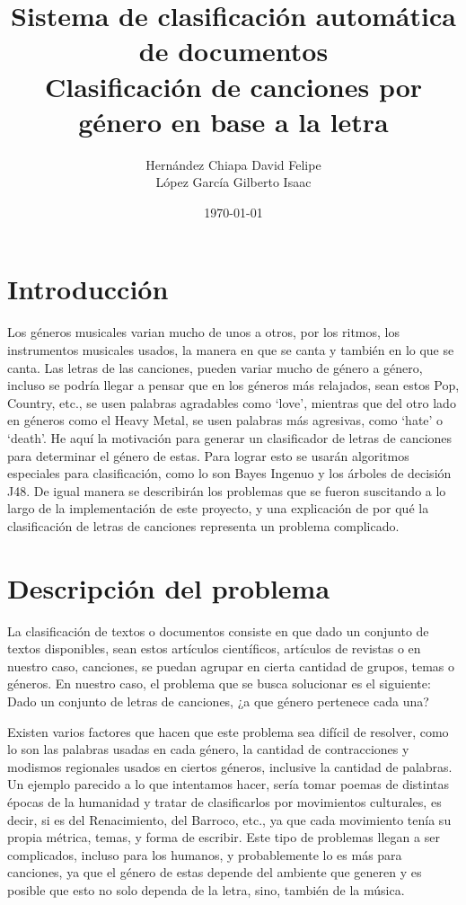 \documentclass[spanish,11pt,letterpaper]{article}
\title{Sistema de clasificación automática de documentos\\
Clasificación de canciones por género en base a la letra}
\author{Hernández Chiapa David Felipe\\
López García Gilberto Isaac}
\affil{Facultad de Ciencias\\{\small Universidad Nacional Autónoma de México}}
\date{\small\today}
\begin{document}
\maketitle

\section{Introducción}

Los géneros musicales varian mucho de unos a otros, por los ritmos, los instrumentos musicales
usados, la manera en que se canta y también en lo que se canta. Las letras de las canciones, pueden
variar mucho de género a género, incluso se podría llegar a pensar que en los géneros más
relajados, sean estos Pop, Country, etc., se usen palabras agradables como ‘love’, mientras que del
otro lado en géneros como el Heavy Metal, se usen palabras más agresivas, como ‘hate’ o ‘death’.
He aquí la motivación para generar un clasificador de letras de canciones para determinar el género de
estas. Para lograr esto se usarán algoritmos especiales para clasificación, como lo son Bayes
Ingenuo y los árboles de decisión J48. De igual manera se describirán los problemas que se
fueron suscitando a lo largo de la implementación de este proyecto, y una explicación de por qué
la clasificación de letras de canciones representa un problema complicado.

\section{Descripción del problema}

La clasificación de textos o documentos consiste en que dado un conjunto de textos disponibles,
sean estos artículos científicos, artículos de revistas o en nuestro caso, canciones, se puedan
agrupar en cierta cantidad de grupos, temas o géneros. En nuestro caso, el problema que se busca
solucionar es el siguiente: Dado un conjunto de letras de canciones, ¿a que género pertenece cada
una?

Existen varios factores que hacen que este problema sea difícil de resolver, como lo son las
palabras usadas en cada género, la cantidad de contracciones y modismos regionales usados en ciertos géneros,
inclusive la cantidad de palabras. Un ejemplo parecido a lo que intentamos hacer, sería tomar
poemas de distintas épocas de la humanidad y tratar de clasificarlos por movimientos culturales, es
decir, si es del Renacimiento, del Barroco, etc., ya que cada movimiento tenía su propia métrica,
temas, y forma de escribir. Este tipo de problemas llegan a ser complicados, incluso para los
humanos, y probablemente lo es más para canciones, ya que el género de estas depende del ambiente
que generen y es posible que esto no solo dependa de la letra, sino, también de la música.
\end{document}
